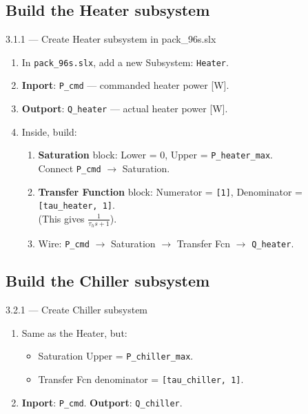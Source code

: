 \documentclass[11pt,a4paper]{article}
\begin{document}
\subsection{Build the Heater subsystem}

\begin{guistep}{3.1.1 — Create Heater subsystem in pack\_96s.slx}
\begin{enumerate}
    \item In \texttt{pack\_96s.slx}, add a new Subsystem: \texttt{Heater}.
    \item \textbf{Inport}: \texttt{P\_cmd} — commanded heater power [W].
    \item \textbf{Outport}: \texttt{Q\_heater} — actual heater power [W].
    \item Inside, build:
    \begin{enumerate}[label=\alph*)]
        \item \textbf{Saturation} block: Lower = 0, Upper = \texttt{P\_heater\_max}.\\
              Connect \texttt{P\_cmd} $\to$ Saturation.
        \item \textbf{Transfer Function} block: Numerator = \texttt{[1]}, Denominator = \texttt{[tau\_heater, 1]}.\\
              (This gives $\frac{1}{\tau_h s + 1}$).
        \item Wire: \texttt{P\_cmd} $\to$ Saturation $\to$ Transfer Fcn $\to$ \texttt{Q\_heater}.
    \end{enumerate}
\end{enumerate}
\end{guistep}

\subsection{Build the Chiller subsystem}

\begin{guistep}{3.2.1 — Create Chiller subsystem}
\begin{enumerate}
    \item Same as the Heater, but:
    \begin{itemize}
        \item Saturation Upper = \texttt{P\_chiller\_max}.
        \item Transfer Fcn denominator = \texttt{[tau\_chiller, 1]}.
    \end{itemize}
    \item \textbf{Inport}: \texttt{P\_cmd}. \textbf{Outport}: \texttt{Q\_chiller}.
\end{enumerate}
\end{guistep}
\end{document}
